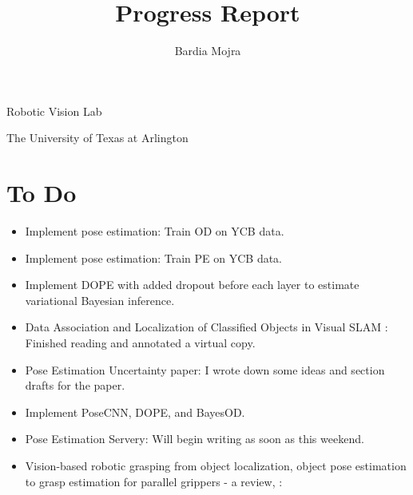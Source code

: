 \documentclass[11pt]{article}
\title{Progress Report}
\author{Bardia Mojra}
\begin{document}
\maketitle
\thispagestyle{empty}

\bigskip
\bigskip
\begin{center}
      Robotic Vision Lab
\end{center}

\begin{center}
      The University of Texas at Arlington
\end{center}

\newpage

\section{To Do}
\begin{itemize}
      \item Implement pose estimation: Train OD on YCB data.
      \item Implement pose estimation: Train PE on YCB data.
      \item Implement DOPE with added dropout before each layer to estimate
            variational Bayesian inference.
      \item Data Association and Localization of Classified Objects in Visual
      SLAM \cite{iqbal2020data}: Finished reading and annotated a virtual copy.
      \item Pose Estimation Uncertainty paper: I wrote down some ideas
      and section drafts for the paper.
      \item Implement PoseCNN, DOPE, and BayesOD.
      \item Pose Estimation Servery: Will begin writing as soon as this weekend.
      \item Vision-based robotic grasping from object localization, object pose
      estimation to grasp estimation for parallel grippers - a review,
      \cite{du2020vision}:

\end{itemize}
\end{document}
